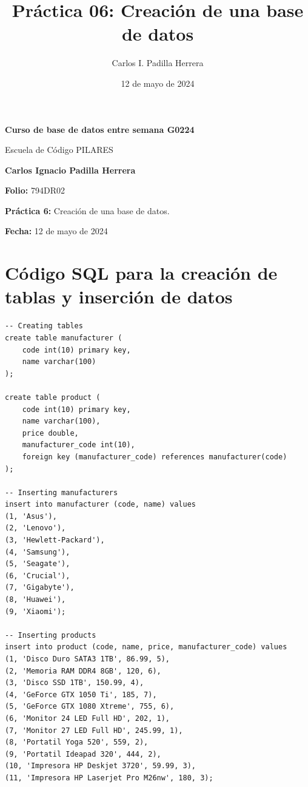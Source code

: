 \documentclass{article}
\title{Práctica 06: Creación de una base de datos}
\author{Carlos I. Padilla Herrera}
\date{12 de mayo de 2024}
\begin{document}
\begin{titlepage}
    \centering
    \vspace*{1cm}
    \Huge\textbf{Curso de base de datos entre semana G0224}
    
    \vspace{0.5cm}
    \LARGE Escuela de Código PILARES
    
    \vspace{1.5cm}
    \textbf{Carlos Ignacio Padilla Herrera}
    
    \vspace{2cm}
    \Large\textbf{Folio:} 794DR02
    
    \vspace{0.5cm}
    \Large\textbf{Práctica 6:} Creación de una base de datos.
    
    \vfill
    
    \Large\textbf{Fecha:} 12 de mayo de 2024
    
    \vspace{0.8cm}
\end{titlepage}

\newpage

\section*{Código SQL para la creación de tablas y inserción de datos}

\begin{lstlisting}
-- Creating tables
create table manufacturer (
    code int(10) primary key,
    name varchar(100)
);

create table product (
    code int(10) primary key,
    name varchar(100),
    price double,
    manufacturer_code int(10),
    foreign key (manufacturer_code) references manufacturer(code)
);

-- Inserting manufacturers
insert into manufacturer (code, name) values
(1, 'Asus'),
(2, 'Lenovo'),
(3, 'Hewlett-Packard'),
(4, 'Samsung'),
(5, 'Seagate'),
(6, 'Crucial'),
(7, 'Gigabyte'),
(8, 'Huawei'),
(9, 'Xiaomi');

-- Inserting products
insert into product (code, name, price, manufacturer_code) values
(1, 'Disco Duro SATA3 1TB', 86.99, 5),
(2, 'Memoria RAM DDR4 8GB', 120, 6),
(3, 'Disco SSD 1TB', 150.99, 4),
(4, 'GeForce GTX 1050 Ti', 185, 7),
(5, 'GeForce GTX 1080 Xtreme', 755, 6),
(6, 'Monitor 24 LED Full HD', 202, 1),
(7, 'Monitor 27 LED Full HD', 245.99, 1),
(8, 'Portatil Yoga 520', 559, 2),
(9, 'Portatil Ideapad 320', 444, 2),
(10, 'Impresora HP Deskjet 3720', 59.99, 3),
(11, 'Impresora HP Laserjet Pro M26nw', 180, 3);
\end{lstlisting}
\end{document}
